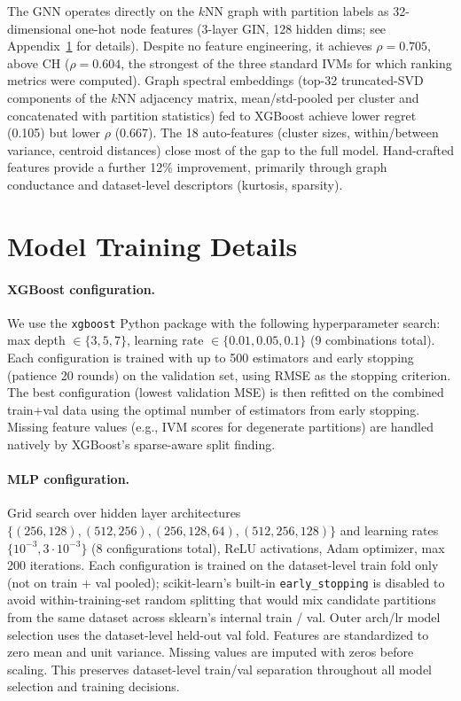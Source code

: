 \documentclass[10pt]{article} %
\begin{document}
The GNN operates directly on the $k$NN graph with partition labels as 32-dimensional one-hot node features (3-layer GIN, 128 hidden dims; see Appendix~\ref{app:training} for details). Despite no feature engineering, it achieves $\rho = 0.705$, above CH ($\rho = 0.604$, the strongest of the three standard IVMs for which ranking metrics were computed). Graph spectral embeddings (top-32 truncated-SVD components of the $k$NN adjacency matrix, mean/std-pooled per cluster and concatenated with partition statistics) fed to XGBoost achieve lower regret (0.105) but lower $\rho$ (0.667). The 18 auto-features (cluster sizes, within/between variance, centroid distances) close most of the gap to the full model. Hand-crafted features provide a further 12\% improvement, primarily through graph conductance and dataset-level descriptors (kurtosis, sparsity).


\section{Model Training Details}
\label{app:training}

\paragraph{XGBoost configuration.}
We use the \texttt{xgboost} Python package with the following hyperparameter search: max depth $\in \{3, 5, 7\}$, learning rate $\in \{0.01, 0.05, 0.1\}$ (9 combinations total). Each configuration is trained with up to 500 estimators and early stopping (patience 20 rounds) on the validation set, using RMSE as the stopping criterion. The best configuration (lowest validation MSE) is then refitted on the combined train+val data using the optimal number of estimators from early stopping. Missing feature values (e.g., IVM scores for degenerate partitions) are handled natively by XGBoost's sparse-aware split finding.

\paragraph{MLP configuration.}
Grid search over hidden layer architectures $\{(256, 128), (512, 256), (256, 128, 64), (512, 256, 128)\}$ and learning rates $\{10^{-3}, 3 \cdot 10^{-3}\}$ (8 configurations total), ReLU activations, Adam optimizer, max 200 iterations. Each configuration is trained on the dataset-level train fold only (not on train + val pooled); scikit-learn's built-in \texttt{early\_stopping} is disabled to avoid within-training-set random splitting that would mix candidate partitions from the same dataset across sklearn's internal train / val. Outer arch/lr model selection uses the dataset-level held-out val fold. Features are standardized to zero mean and unit variance. Missing values are imputed with zeros before scaling. This preserves dataset-level train/val separation throughout all model selection and training decisions.
\end{document}
